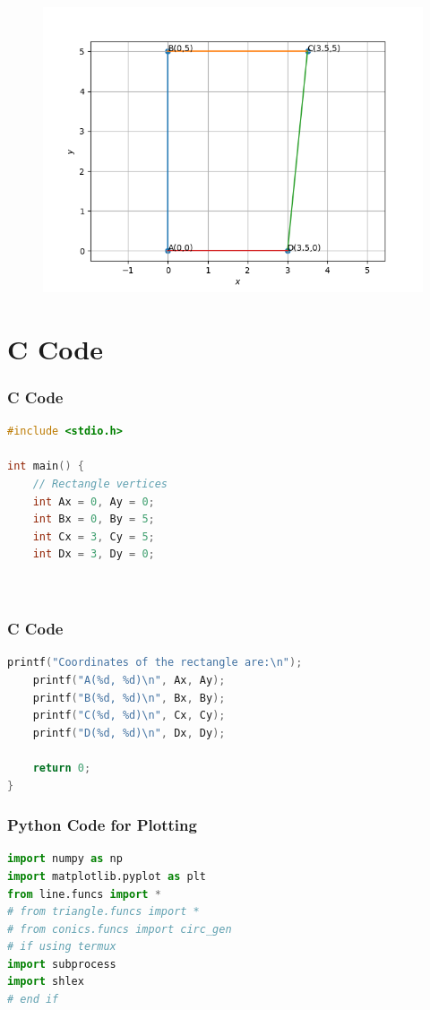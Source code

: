 \documentclass{beamer}
\theoremstyle{remark}
\numberwithin{equation}{section}
\begin{document}
       \begin{frame}[fragile]
    \begin{figure}[H]
    \centering
    \includegraphics[width = 0.6\columnwidth]{../figs/img.png}
    \caption*{}
    \label{figs}
\end{figure}
\end{frame}
\section{ C Code}
\begin{frame}[fragile]
\frametitle{C Code }
\begin{lstlisting}[language=C]
#include <stdio.h>

int main() {
    // Rectangle vertices
    int Ax = 0, Ay = 0;
    int Bx = 0, By = 5;
    int Cx = 3, Cy = 5;
    int Dx = 3, Dy = 0;

 

\end{lstlisting}
\end{frame}

\begin{frame}[fragile]
\frametitle{C Code }
\begin{lstlisting}[language=C]
       printf("Coordinates of the rectangle are:\n");
    printf("A(%d, %d)\n", Ax, Ay);
    printf("B(%d, %d)\n", Bx, By);
    printf("C(%d, %d)\n", Cx, Cy);
    printf("D(%d, %d)\n", Dx, Dy);

    return 0;
}
\end{lstlisting}
\end{frame}



\begin{frame}[fragile]
\frametitle{Python Code for Plotting}
\begin{lstlisting}[language=Python]
import numpy as np
import matplotlib.pyplot as plt
from line.funcs import *
# from triangle.funcs import *
# from conics.funcs import circ_gen
# if using termux
import subprocess
import shlex
# end if

\end{lstlisting}

\end{frame}
\end{document}

